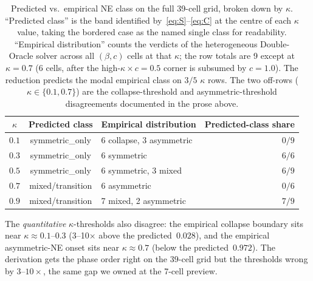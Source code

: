 \documentclass{anvil-paper}
\begin{document}
\begin{table}[h]
  \centering
  \small
  \setlength{\tabcolsep}{6pt}
  \begin{tabular}{cclr}
    \toprule
    $\kappa$ & Predicted class & Empirical distribution
             & Predicted-class share \\
    \midrule
    $0.1$ & \textsf{symmetric\_only}
          & 6 \textsf{collapse}, 3 \textsf{asymmetric}
          & $0/9$ \\
    $0.3$ & \textsf{symmetric\_only}
          & 6 \textsf{symmetric}
          & $6/6$ \\
    $0.5$ & \textsf{symmetric\_only}
          & 6 \textsf{symmetric}, 3 \textsf{mixed}
          & $6/9$ \\
    $0.7$ & \textsf{mixed}/transition
          & 6 \textsf{asymmetric}
          & $0/6$ \\
    $0.9$ & \textsf{mixed}/transition
          & 7 \textsf{mixed}, 2 \textsf{asymmetric}
          & $7/9$ \\
    \bottomrule
  \end{tabular}
  \caption{Predicted vs.\ empirical NE class on the full 39-cell
  grid, broken down by $\kappa$. ``Predicted class'' is the band
  identified by~\eqref{eq:S}--\eqref{eq:C} at the centre of each
  $\kappa$ value, taking the bordered case as the named single class
  for readability. ``Empirical distribution'' counts the verdicts of
  the heterogeneous Double-Oracle solver across all $(\beta, c)$
  cells at that $\kappa$; the row totals are 9 except at $\kappa=0.7$
  (6 cells, after the high-$\kappa\times c{=}0.5$ corner is subsumed
  by $c{=}1.0$). The reduction predicts the modal empirical class on
  $3/5$ $\kappa$ rows. The two off-rows
  ($\kappa{\in}\{0.1, 0.7\}$) are the collapse-threshold and
  asymmetric-threshold disagreements documented in the prose
  above.}
  \label{tab:phase-counts}
\end{table}

The \emph{quantitative} $\kappa$-thresholds also disagree: the empirical
collapse boundary sits near $\kappa\approx 0.1$--$0.3$
(3--10$\times$ above the predicted~$0.028$), and the empirical asymmetric-NE
onset sits near $\kappa\approx 0.7$ (below the predicted~$0.972$). The
derivation gets the phase order right on the $39$-cell grid but the
thresholds wrong by $3$--$10\times$, the same gap we owned at the 7-cell
preview.
\end{document}
